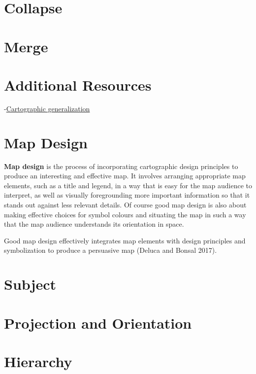 \documentclass[
]{book}
\begin{document}
\hypertarget{collapse}{%
\section{Collapse}\label{collapse}}

\hypertarget{merge}{%
\section{Merge}\label{merge}}

\hypertarget{additional-resources-3}{%
\section{Additional Resources}\label{additional-resources-3}}

-\href{http://wiki.gis.com/wiki/index.php/Cartographic_generalization}{Cartographic generalization}

\hypertarget{map-design}{%
\section{Map Design}\label{map-design}}

\textbf{Map design} is the process of incorporating cartographic design principles to produce an interesting and effective map. It involves arranging appropriate map elements, such as a title and legend, in a way that is easy for the map audience to interpret, as well as visually foregrounding more important information so that it stands out against less relevant details. Of course good map design is also about making effective choices for symbol colours and situating the map in such a way that the map audience understands its orientation in space.

Good map design effectively integrates map elements with design principles and symbolization to produce a persuasive map (Deluca and Bonsal 2017).

\hypertarget{subject}{%
\section{Subject}\label{subject}}

\hypertarget{projection-and-orientation}{%
\section{Projection and Orientation}\label{projection-and-orientation}}

\hypertarget{hierarchy}{%
\section{Hierarchy}\label{hierarchy}}
\end{document}
